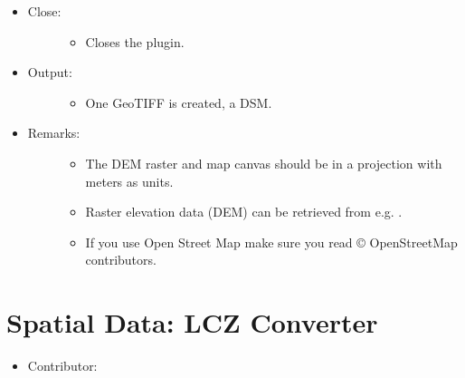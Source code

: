 \documentclass[letterpaper,10pt,english]{sphinxmanual}
\begin{document}
\begin{itemize}
\item {} \begin{description}
\item[{Close:}] \leavevmode\begin{itemize}
\item {} 
Closes the plugin.

\end{itemize}

\end{description}

\item {} \begin{description}
\item[{Output:}] \leavevmode\begin{itemize}
\item {} 
One GeoTIFF is created, a DSM.

\end{itemize}

\end{description}

\item {} \begin{description}
\item[{Remarks:}] \leavevmode\begin{itemize}
\item {} 
The DEM raster and map canvas should be in a projection with meters as units.

\item {} 
Raster elevation data (DEM) can be retrieved from e.g. .

\item {} 
If you use Open Street Map make sure you read  © OpenStreetMap contributors.

\end{itemize}

\end{description}

\end{itemize}


\section{Spatial Data: LCZ Converter}
\label{\detokenize{pre-processor/Spatial Data LCZ Converter:spatial-data-lcz-converter}}\label{\detokenize{pre-processor/Spatial Data LCZ Converter:lczconverter}}\label{\detokenize{pre-processor/Spatial Data LCZ Converter::doc}}\begin{itemize}
\item {} 
Contributor:

\end{itemize}
\end{document}

